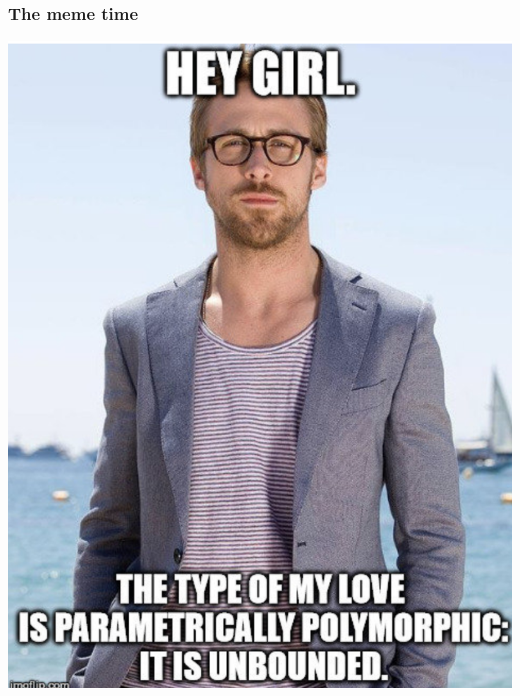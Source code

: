 \documentclass[10pt,pdf,utf8,russian,aspectratio=169]{beamer}
\begin{document}
\begin{frame}
  \frametitle{The meme time}

  \begin{center}
  \includegraphics[scale=0.3]{Pics/Ryan.png}
  \end{center}
\end{frame}
\end{document}
